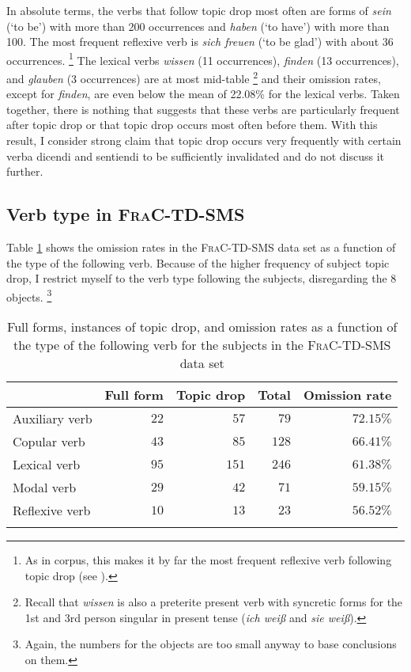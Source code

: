 In absolute terms, the verbs that follow topic drop most often are forms of \textit{sein} (`to be') with more than 200 occurrences and \textit{haben} (`to have') with more than 100. 
The most frequent reflexive verb  is \textit{sich freuen} (`to be glad') with about 36 occurrences.%
\footnote{As in  corpus, this makes it by far the most frequent reflexive verb  following topic drop (see ).}
%
The lexical verbs  \textit{wissen} (11 occurrences), \textit{finden} (13 occurrences), and \textit{glauben} (3 occurrences) are at most mid-table%
\footnote{Recall that \textit{wissen} is also a preterite present verb with syncretic forms for the 1st and 3rd person singular in present tense (\textit{ich weiß} and \textit{sie weiß}).}
%
and their omission rates, except for \textit{finden}, are even below the mean of 22.08\% for the lexical verbs.
Taken together, there is nothing that suggests that these verbs are particularly frequent after topic drop or that topic drop occurs most often before them.
With this result, I consider  strong claim that topic drop occurs very frequently with certain verba dicendi and sentiendi to be sufficiently invalidated and do not discuss it further.

\subsection{Verb type in \textsc{FraC-TD-SMS}}\label{sec:corpus.mess.verb}
Table \ref{tab:frac.verb.type} shows the omission rates in the \textsc{FraC-TD-SMS} data set as a function of the type of the following verb.
Because of the higher frequency of subject topic drop, I restrict myself to the verb type following the subjects, disregarding the 8 objects.%
\footnote{Again, the numbers for the objects are too small anyway to base conclusions on them.}

    
\begin{table}
\centering
\caption{Full forms, instances of topic drop, and omission rates as a function of the type of the following verb for the subjects in the \textsc{FraC-TD-SMS} data set}
\begin{tabular}{lrrrr}
\lsptoprule
\multicolumn{1}{c}{Verb type} & \multicolumn{1}{c}{Full form} & \multicolumn{1}{c}{Topic drop} & \multicolumn{1}{c}{Total} & \multicolumn{1}{c}{Omission rate} \\
\midrule
Auxiliary verb& $22$ & $57$ & $79$ & $72.15\%$ \\
Copular verb& $43$ & $85$ & $128$ & $66.41\%$ \\
Lexical verb& $95$ & $151$ & $246$ & $61.38\%$ \\
Modal verb& $29$ & $42$ & $71$ & $59.15\%$ \\
Reflexive verb& $10$ & $13$ & $23$ & $56.52\%$ \\
\lspbottomrule
\end{tabular}
\label{tab:frac.verb.type}
\end{table}

